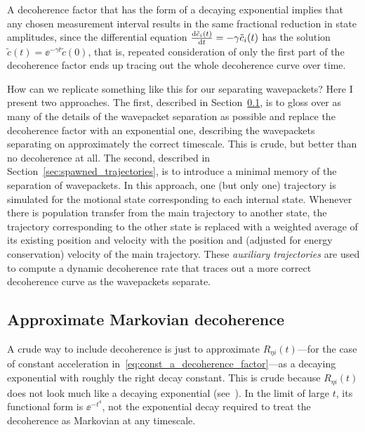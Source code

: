 A decoherence factor that has the form of a decaying exponential implies that any chosen measurement interval results in the same fractional reduction in state amplitudes, since the differential equation $\dv{\tilde c_{i}(t)}{t} = -\gamma \tilde c_i(t)$ has the solution $\tilde c(t) = \ee^{-\gamma t} \tilde c(0)$, that is, repeated consideration of only the first part of the decoherence factor ends up tracing out the whole decoherence curve over time.

How can we replicate something like this for our separating wavepackets? Here I present two approaches. The first, described in Section~\ref{sec:markovian_decoherence}, is to gloss over as many of the details of the wavepacket separation as possible and replace the decoherence factor with an exponential one, describing the wavepackets separating on approximately the correct timescale. This is crude, but better than no decoherence at all. The second, described in Section~\ref{sec:spawned_trajectories}, is to introduce a minimal memory of the separation of wavepackets. In this approach, one (but only one) trajectory is simulated for the motional state corresponding to each internal state. Whenever there is population transfer from the main trajectory to another state, the trajectory corresponding to the other state is replaced with a weighted average of its existing position and velocity with the position and (adjusted for energy conservation) velocity of the main trajectory. These \emph{auxiliary trajectories} are used to compute a dynamic decoherence rate that traces out a more correct decoherence curve as the wavepackets separate.

\subsection{Approximate Markovian decoherence}\label{sec:markovian_decoherence}

A crude way to include decoherence is just to approximate $R_{\eta i}(t)$---for the case of constant acceleration in~\eqref{eq:const_a_decoherence_factor}---as a decaying exponential with roughly the right decay constant. This is crude because $R_{\eta i}(t)$ does not look much like a decaying exponential (see~). In the limit of large $t$, its functional form is $\ee^{-t^4}$, not the exponential decay required to treat the decoherence as Markovian at any timescale.

